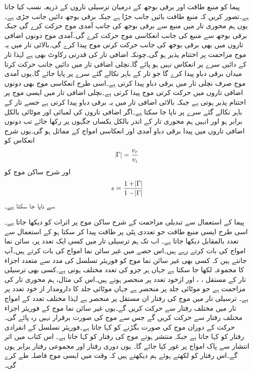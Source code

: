 پیما کو منبع طاقت اور برقی بوجھ کے درمیان ترسیلی تاروں کے ذریعہ نسب کیا جاتا ہے۔تصور کریں کہ منبع طاقت بائیں جانب جڑا ہے جبکہ برقی بوجھ دائیں جانب جڑی ہے۔یوں ہم محوری تار میں منبع سے برقی بوجھ کی جانب آمدی موج حرکت کرے گی جبکہ برقی بوجھ سے منبع کی جانب انعکاسی موج حرکت کرے گی۔آمدی موج دونوں اضافی تاروں میں بھی برقی بوجھ کی جانب حرکت کرتی موج پیدا کرے گی۔بالائی تار میں یہ موج مزاحمت  پر اختتام پذیر ہو گی۔چونکہ اضافی تار کی قدرتی رکاوٹ بھی  ہے لہٰذا تار کے دائیں سرے پر انعکاس نہیں ہو پائے گا۔نچلی اضافی تار میں دائیں جانب حرکت کرتا میدان  برقی دباو  پیدا کرے گا جو تار کے باہر نکالے گئے سرے پر پایا جائے گا۔یوں آمدی موج صرف نچلی تار میں برقی دباو پیدا کرتی ہے۔اسی طرح انعکاسی موج بھی دونوں اضافی تاروں میں حرکت کرتی موج پیدا کرتی ہے۔نچلی اضافی تار میں ایسی موج  پر اختتام پذیر ہوتی ہے جبکہ بالائی اضافی تار میں یہ  برقی دباو پیدا کرتی ہے جسے تار کے باہر نکالے گئے سرے پر ناپا جا سکتا ہے۔اگر اضافی تاروں کی لمبائی اور موٹائی بالکل برابر ہو اور انہیں ہم محوری تار کے اندر بالکل یکساں جگہوں پر رکھا جائے تب دونوں اضافی تاروں میں پیدا برقی دباو آمدی اور انعکاسی امواج کے مماثل ہو گی۔یوں شرح انعکاس کو
\begin{align}
\abs{\Gamma}=\frac{v_r}{v_i}
\end{align}
اور شرح ساکن موج کو
\begin{align}
s=\frac{1+\abs{\Gamma}}{1-\abs{\Gamma}}
\end{align}
سے ناپا جا سکتا ہے۔

پیما کے استعمال سے  تبدیلی مزاحمت کے شرح ساکن موج پر اثرات کو دیکھا جاتا ہے۔اسی طرح ایسی منبع طاقت جو تعددی پٹی پر طاقت پیدا کر سکتا ہو کے استعمال سے تعدد بالمقابل  دیکھا جاتا ہے۔
اب تک ہم  ترسیلی تار میں کسی ایک تعدد پر،  سائن نما امواج کی بات کرتے رہے ہیں۔اس حصے میں غیر سائن نما امواج کی بات کرتے ہیں۔آپ جانتے ہیں کہ کسی بھی غیر سائن نما موج کو فوریئر تسلسل کی مدد سے متعدد اجزاء کا مجموعہ لکھا جا سکتا ہے جہاں ہر جزو کی تعدد مختلف ہوتی ہے۔کسی بھی ترسیلی تار کے مستقل ، ،  اور  ازخود تعدد پر منحصر ہوتے ہیں۔اس کی مثال، ہم محوری تار کی مزاحمت ہے جو موٹائی جلد پر منحصر ہے جہاں موٹائی جلد کا دارومدار از خود تعدد پر ہے۔ ترسیلی تار میں موج کی رفتار ان مستقل پر منحصر ہے لہٰذا مختلف تعدد کے امواج تار میں مختلف رفتار سے حرکت کریں گے۔یوں غیر سائن نما موج کے فوریئر اجزاء مختلف رفتار سے حرکت کریں گے جس سے موج کی صورت برقرار نہیں رہ پائے گی۔حرکت کے دوران موج کی صورت بگڑنے کو  کہا جاتا ہے۔فوریئر تسلسل کے انفرادی رفتار  کو  کہا جاتا ہے جبکہ منتشر ہوتے موج کی رفتار  کو  کہا جاتا ہے۔ اس کتاب میں اثر انتشار سے پاک امواج پر غور کیا جائے گا۔ یوں دوری رفتار اور مجموعی رفتار برابر ہوں گے۔اس رفتار کو  لکھتے ہوئے ہم دیکھتے ہیں کہ وقت  میں ایسی موج   فاصلہ طے کرے گی۔

